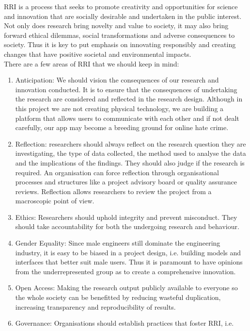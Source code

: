 RRI is a process that seeks to promote creativity and opportunities for science and innovation that are socially desirable and undertaken in the public interest.\cite{ukri} Not only does research bring novelty 
and value to society, it may also bring forward ethical dilemmas, social transformations and adverse consequences to society. Thus it is key to put emphasis on innovating responsibly and creating changes that
have positive societal and environmental impacts.\\ There are a few areas of RRI that we should keep in mind:
\begin{enumerate}
    \item Anticipation: We should vision the consequences of our research and innovation conducted. It is to ensure that the consequences of undertaking the research are considered and reflected in the research 
    design. Although in this project we are not creating physical technology, we are building a platform that allows users to communicate with each other and if not dealt carefully, our app may become a breeding 
    ground for online hate crime.
    \item Reflection: researchers should always reflect on the research question they are investigating, the type of data collected, the method used to analyse the data and the implications of the findings.
    They should also judge if the research is required. An organisation can force reflection through organisational processes and structures like a project advisory board or quality assurance reviews. Reflection 
    allows researchers to review the project from a macroscopic point of view.
    \item Ethics: Researchers should uphold integrity and prevent misconduct. They should take accountability for both the undergoing research and behaviour.
    \item Gender Equality: Since male engineers still dominate the engineering industry, it is easy to be biased in a project design, i.e. building models and interfaces that better suit male users. Thus it is 
    paramount to have opinions from the underrepresented group as to create a comprehensive innovation.
    \item Open Access: Making the research output publicly available to everyone so the whole society can be benefitted by reducing wasteful duplication, increasing transparency and reproducibility of results.
    \item Governance: Organisations should establish practices that foster RRI, i.e. 
    \begin{itemize}

\end{itemize}
\end{enumerate}
